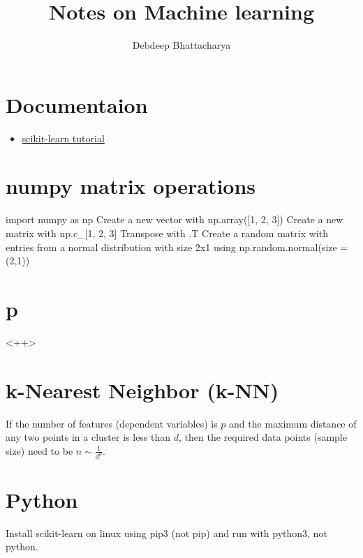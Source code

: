 \documentclass[12pt]{article}
\begin{document}
\title{Notes on Machine learning}
\author{Debdeep Bhattacharya}
\maketitle 

\section{Documentaion}
\begin{itemize}
  \item \href{https://scikit-learn.org/stable/tutorial/statistical_inference/supervised_learning.html}{scikit-learn tutorial}
\end{itemize}

\section{numpy matrix operations}
import numpy as np
Create a new vector with np.array([1, 2, 3])
Create a new matrix with np.c\_[1, 2, 3]
Transpose with .T
Create a random matrix with entries from a normal distribution with size 2x1 using np.random.normal(size = (2,1))

\section{p}<++>

\section{k-Nearest Neighbor (k-NN)}
If the number of features (dependent variables) is $p$ and the maximum distance of any two points in a cluster is less than $d$, then the required data points (sample size) need to be $n \sim \frac{1}{d^p}$.

\section{Python}
Install scikit-learn on linux using pip3 (not pip) and run with python3, not python.
\end{document}
